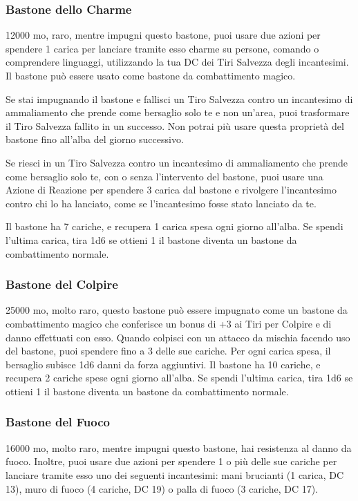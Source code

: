 \begin{multicols}{2}
\subsubsection*{Bastone dello Charme}
12000 mo, raro, mentre impugni questo bastone, puoi usare due azioni per spendere 1 carica per lanciare tramite esso charme su persone, comando o comprendere linguaggi, utilizzando la tua DC dei Tiri Salvezza degli incantesimi. Il bastone può essere usato come bastone da combattimento magico.

Se stai impugnando il bastone e fallisci un Tiro Salvezza contro un incantesimo di ammaliamento che prende come bersaglio solo te e non un'area, puoi trasformare il Tiro Salvezza fallito in un successo. Non potrai più usare questa proprietà del bastone fino all'alba del giorno successivo.

Se riesci in un Tiro Salvezza contro un incantesimo di ammaliamento che prende come bersaglio solo te, con o senza l'intervento del bastone, puoi usare una Azione di Reazione per spendere 3 carica dal bastone e rivolgere l'incantesimo contro chi lo ha lanciato, come se l'incantesimo fosse stato lanciato da te.

Il bastone ha 7 cariche, e recupera 1 carica spesa ogni giorno all'alba. Se spendi l'ultima carica, tira 1d6 se ottieni 1 il bastone diventa un bastone da combattimento normale.

\subsubsection*{Bastone del Colpire}
25000 mo, molto raro, questo bastone può essere impugnato come un bastone da combattimento magico che conferisce un bonus di +3 ai Tiri per Colpire e di danno effettuati con esso. Quando colpisci con un attacco da mischia facendo uso del bastone, puoi spendere fino a 3 delle sue cariche. Per ogni carica spesa, il bersaglio subisce 1d6 danni da forza aggiuntivi. Il bastone ha 10 cariche, e recupera 2 cariche spese ogni giorno all'alba. Se spendi l'ultima carica, tira 1d6 se ottieni 1 il bastone diventa un bastone da combattimento normale.

\subsubsection*{Bastone del Fuoco}
16000 mo, molto raro, mentre impugni questo bastone, hai resistenza al danno da fuoco.
Inoltre, puoi usare due azioni per spendere 1 o più delle sue cariche per lanciare tramite esso uno dei seguenti incantesimi: mani brucianti (1 carica, DC 13), muro di fuoco (4 cariche, DC 19) o palla di fuoco (3 cariche, DC 17).


\end{multicols}
